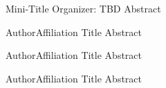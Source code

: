 \label{mini01}

\miniabs
{Mini-Title}
{Organizer: TBD}
{Abstract}

\vspace{2ex}

\abs
{Author}{Affiliation}
{Title}
{Abstract
}

\vspace{1.5ex}

\abs
{Author}{Affiliation}
{Title}
{Abstract
}

\vspace{1.5ex}

\abs
{Author}{Affiliation}
{Title}
{Abstract
}
